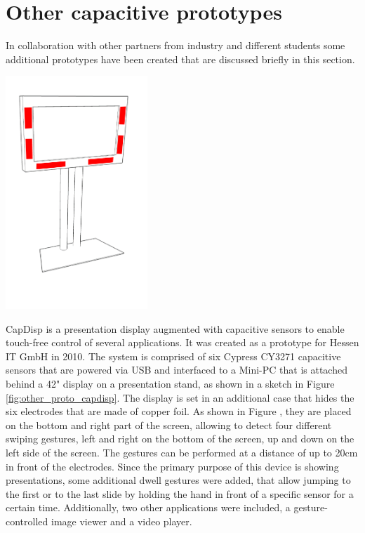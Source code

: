 \section{Other capacitive prototypes}
\label{ch:prot_otherprot}
In collaboration with other partners from industry and different students some additional prototypes have been created that are discussed briefly in this section. 

\begin{minipage}{\linewidth}
\centering
\includegraphics[width=0.4\textwidth]{images/other_proto_capdisp}
\label{fig:other_proto_capdisp}
\end{minipage}

CapDisp is a presentation display augmented with capacitive sensors to enable touch-free control of several applications. It was created as a prototype for Hessen IT GmbH in 2010. The system is comprised of six Cypress CY3271 capacitive sensors that are powered via USB and interfaced to a Mini-PC that is attached behind a 42" display on a presentation stand, as shown in a sketch in Figure \ref{fig:other_proto_capdisp}. The display is set in an additional case that hides the six electrodes that are made of copper foil. As shown in Figure , they are placed on the bottom and right part of the screen, allowing to detect four different swiping gestures, left and right on the bottom of the screen, up and down on the left side of the screen. The gestures can be performed at a distance of up to 20cm in front of the electrodes. Since the primary purpose of this device is showing presentations, some additional dwell gestures were added, that allow jumping to the first or to the last slide by holding the hand in front of a specific sensor for a certain time. Additionally, two other applications were included, a gesture-controlled image viewer and a video player.

